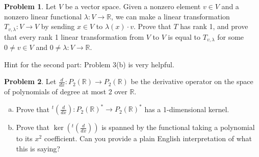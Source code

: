 \documentclass[11pt,oneside]{amsart}
\theoremstyle{definition}
\newtheorem{problem}{Problem}
\newcommand{\bR}{\mathbb{R}}
\newcommand{\eps}{\varepsilon}
\begin{document}
    \begin{problem}
        Let $V$ be a vector space. Given a nonzero element $v\in V$ and a nonzero linear functional $\lambda\colon V\to \bR$, we can make a linear transformation $T_{v,\lambda}\colon V\to V$ by sending $x\in V$ to $\lambda(x)\cdot v$. Prove that $T$ has rank 1, and prove that every rank 1 linear transformation from $V$ to $V$ is equal to $T_{v,\lambda}$ for some $0\neq v\in V$ and $0\neq \lambda\colon V\to \bR$.

        Hint for the second part: Problem 3(b) is very helpful.
    \end{problem}

    \begin{problem}
        Let $\frac d{dx}\colon P_2(\bR)\to P_2(\bR)$ be the derivative operator on the space of polynomials of degree at most 2 over $\bR$.
        \begin{enumerate}[(a)]
            \item Prove that $^t(\frac d{dx})\colon P_2(\bR)^*\to P_2(\bR)^*$ has a 1-dimensional kernel.
            \item Prove that $\ker(^t(\frac d{dx}))$ is spanned by the functional taking a polynomial to its $x^2$ coefficient. Can you provide a plain English interpretation of what this is saying?
        \end{enumerate}
    \end{problem}
\end{document}
